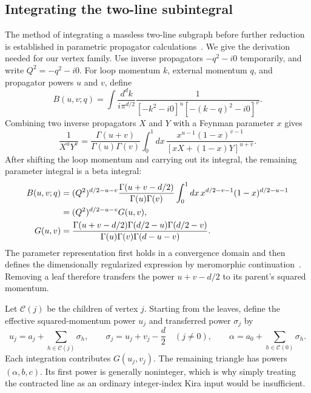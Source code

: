 \subsection{Integrating the two-line subintegral}
The method of integrating a massless two-line subgraph before further reduction is established in parametric propagator calculations~\cite{Ruijl2017Forcer}. We give the derivation needed for our vertex family. Use inverse propagators $-q^2-i0$ temporarily, and write $Q^2=-q^2-i0$. For loop momentum $k$, external momentum $q$, and propagator powers $u$ and $v$, define
\begin{equation}
 B(u,v;q)=\int\frac{d^d k}{i\pi^{d/2}}
 \frac{1}{[-k^2-i0]^u[-(k-q)^2-i0]^v}.
 \label{eq:notes-loop-tree-Bdef}
\end{equation}
Combining two inverse propagators $X$ and $Y$ with a Feynman parameter $x$ gives~\cite{Weinzierl2022}
\begin{equation}
 \frac{1}{X^uY^v}=\frac{\Gamma(u+v)}{\Gamma(u)\Gamma(v)}
 \int_0^1 dx\,\frac{x^{u-1}(1-x)^{v-1}}
 {[xX+(1-x)Y]^{u+v}}.
 \label{eq:notes-loop-tree-param}
\end{equation}
After shifting the loop momentum and carrying out its integral, the remaining parameter integral is a beta integral:
\begin{align}
 B(u,v;q)&=(Q^2)^{d/2-u-v}
 \frac{\Gamma(u+v-d/2)}{\Gamma(u)\Gamma(v)}
 \int_0^1 dx\,x^{d/2-v-1}(1-x)^{d/2-u-1}\notag\\
 &=(Q^2)^{d/2-u-v}G(u,v),\label{eq:notes-loop-tree-bubble}\\
 G(u,v)&=\frac{\Gamma(u+v-d/2)\Gamma(d/2-u)\Gamma(d/2-v)}
 {\Gamma(u)\Gamma(v)\Gamma(d-u-v)}.\label{eq:notes-loop-tree-G}
\end{align}
The parameter representation first holds in a convergence domain and then defines the dimensionally regularized expression by meromorphic continuation~\cite{Weinzierl2022}. Removing a leaf therefore transfers the power $u+v-d/2$ to its parent's squared momentum.

Let $\mathcal C(j)$ be the children of vertex $j$. Starting from the leaves, define the effective squared-momentum power $u_j$ and transferred power $\sigma_j$ by
\begin{equation}
 u_j=a_j+\sum_{h\in\mathcal C(j)}\sigma_h,
 \qquad \sigma_j=u_j+v_j-\frac d2\quad(j\ne0),
 \qquad \alpha=a_0+\sum_{h\in\mathcal C(0)}\sigma_h.
 \label{eq:notes-loop-tree-transfer}
\end{equation}
Each integration contributes $G(u_j,v_j)$. The remaining triangle has powers $(\alpha,b,c)$. Its first power is generally noninteger, which is why simply treating the contracted line as an ordinary integer-index Kira input would be insufficient.

